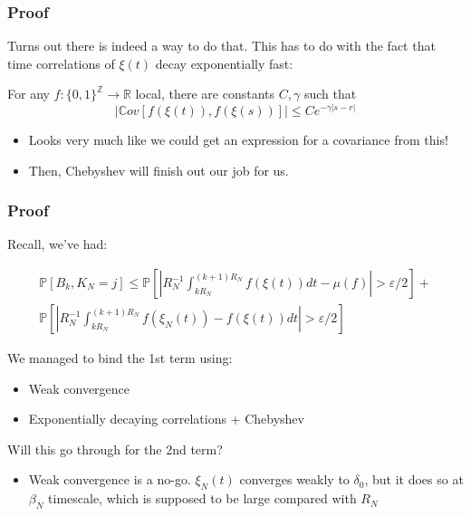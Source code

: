 \documentclass{beamer}
\begin{document}
\begin{frame}
    \frametitle{Proof}
    Turns out there is indeed a way to do that. This has to do with the fact that time correlations of $\xi(t)$ decay exponentially fast:
    \begin{theorem}
        For any $f : \{0,1\}^\mathbb{Z}\rightarrow \mathbb{R}$ local, there are constants $C, \gamma$ such that 
        \[
            \left|\mathbb{C}ov\left[ f(\xi(t)), f(\xi(s))\right]\right| \leq Ce^{-\gamma|s-r|}
        \]
    \end{theorem}
    \begin{itemize}
        \item<3-> Looks very much like we could get an expression for a covariance from this! 
        \item<4-> Then, Chebyshev will finish out our job for us.
    \end{itemize}
\end{frame}

\begin{frame}
    \frametitle{Proof}
    Recall, we've had:

    \begin{gather*}
        \mathbb{P}\left[ B_k, K_{N} = j \right] \leq \mathbb{P}\left[\left|R_N^{-1}\int_{kR_N}^{(k+1)R_N}f(\xi(t))dt - \mu(f)\right| > \varepsilon/2 \right] + \\
        \mathbb{P}\left[\left|R_N^{-1}\int_{kR_N}^{(k+1)R_N}f(\xi_N(t)) - f(\xi(t))dt \right| > \varepsilon/2\right]
    \end{gather*}

    We managed to bind the 1st term using:
    \begin{itemize}
        \item Weak convergence
        \item Exponentially decaying correlations + Chebyshev
    \end{itemize}

    Will this go through for the 2nd term?
    \begin{itemize}
        \item Weak convergence is a no-go. $\xi_N(t)$ converges weakly to $\delta_0$, but it does so at $\beta_N$ timescale, which is supposed to be large compared with $R_N$
    \end{itemize}
\end{frame}
\end{document}
